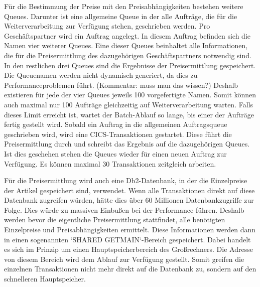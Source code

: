 Für die Bestimmung der Preise mit den Preisabhängigkeiten bestehen weitere Queues.
Darunter ist eine allgemeine Queue in der alle Aufträge, die für die Weiterverarbeitung zur Verfügung stehen, geschrieben werden.
Pro Geschäftspartner wird ein Auftrag angelegt.
In diesem Auftrag befinden sich die Namen vier weiterer Queues.
Eine dieser Queues beinhaltet alle Informationen, die für die Preisermittlung des dazugehörigen Geschäftspartners notwendig sind.
In den restlichen drei Queues sind die Ergebnisse der Preisermittlung gespeichert.
Die Queuenamen werden nicht dynamisch generiert, da dies zu Performanceproblemen führt. (Kommentar: muss man das wissen?)
Deshalb existieren für jede der vier Queues jeweils 100 vorgefertigte Namen.
Somit können auch maximal nur 100 Aufträge gleichzeitig auf Weiterverarbeitung warten.
Falls dieses Limit erreicht ist, wartet der Batch-Ablauf so lange, bis einer der Aufträge fertig gestellt wird.
Sobald ein Auftrag in die allgemeinen Auftragsqueue geschrieben wird, wird eine CICS-Transaktionen gestartet.
Diese führt die Preisermittlung durch und schreibt das Ergebnis auf die dazugehörigen Queues.
Ist dies geschehen stehen die Queues wieder für einen neuen Auftrag zur Verfügung.
Es können maximal 30 Transaktionen zeitgleich arbeiten.

Für die Preisermittlung wird auch eine Db2-Datenbank, in der die Einzelpreise der Artikel gespeichert sind, verwendet.
Wenn alle Transaktionen direkt auf diese Datenbank zugreifen würden, hätte dies über 60 Millionen Datenbankzugriffe zur Folge.
Dies würde zu massiven Einbußen bei der Performance führen.
Deshalb werden bevor die eigentliche Preisermittlung stattfindet, alle benötigten Einzelpreise und Preisabhängigkeiten ermittelt.
Diese Informationen werden dann in einen sogenannten `SHARED GETMAIN`-Bereich gespeichert.
Dabei handelt es sich im Prinzip um einen Hauptspeicherbereich des Großrechners.
Die Adresse von diesem Bereich wird dem Ablauf zur Verfügung gestellt.
Somit greifen die einzelnen Transaktionen nicht mehr direkt auf die Datenbank zu, sondern auf den schnelleren Hauptspeicher.

